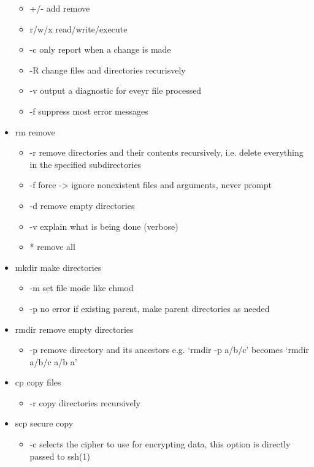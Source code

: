 \documentclass[10pt, a4paper]{article}
\begin{document}
\begin{multicols}{4}
\begin{itemize}
\begin{itemize}
            \item +/- add remove
            \item r/w/x read/write/execute
            \item -c only report when a change is made
            \item -R change files and directories recurisvely
            \item -v output a diagnostic for eveyr file processed
            \item -f suppress most error messages
        \end{itemize}
        \item rm  remove
        \begin{itemize}
            \item -r remove directories and their contents recursively, i.e. delete everything in the specified subdirectories
            \item -f force -> ignore nonexistent files and arguments, never prompt
            \item -d remove empty directories
            \item -v explain what is being done (verbose)
            \item * remove all
        \end{itemize}
        \item mkdir  make directories
        \begin{itemize}
            \item -m set file mode like chmod
            \item -p no error if existing parent, make parent directories as needed
        \end{itemize}
        \item rmdir  remove empty directories
        \begin{itemize}
            \item -p remove directory and its ancestors e.g. `rmdir -p a/b/c' becomes `rmdir a/b/c a/b a'
        \end{itemize}
        \item cp  copy files
        \begin{itemize}
            \item -r copy directories recursively
        \end{itemize}
        \item scp  secure copy
        \begin{itemize}
            \item -c selects the cipher to use for encrypting data, this option is directly passed to ssh(1)

\end{itemize}
\end{itemize}
\end{multicols}
\end{document}
